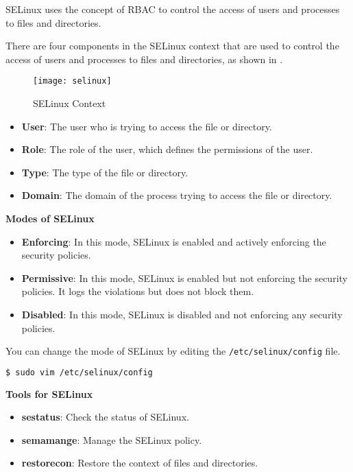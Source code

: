 SELinux uses the concept of RBAC to control the access
of users and processes to files and directories.

There are four components in the SELinux context
that are used to control the access of users and
processes to files and directories, as shown in
.

\begin{figure}[h!]
  \texttt{[image: selinux]}
  \caption{SELinux Context}
\end{figure}

\begin{itemize}
  \item \textbf{User}: The user who is trying to access
    the file or directory.
  \item \textbf{Role}: The role of the user, which defines
    the permissions of the user.
  \item \textbf{Type}: The type of the file or directory.
  \item \textbf{Domain}: The domain
    of the process trying to access the file or directory.
\end{itemize}

\textbf{Modes of SELinux}

\begin{itemize}
  \item \textbf{Enforcing}: In this mode, SELinux is enabled
    and actively enforcing the security policies.
  \item \textbf{Permissive}: In this mode, SELinux is enabled
    but not enforcing the security policies. It logs the
    violations but does not block them.
  \item \textbf{Disabled}: In this mode, SELinux is disabled
    and not enforcing any security policies.
\end{itemize}

You can change the mode of SELinux by editing the
\texttt{/etc/selinux/config} file.

\begin{lstlisting}[language=bash]
$ sudo vim /etc/selinux/config
\end{lstlisting}

\textbf{Tools for SELinux}

\begin{itemize}
  \item \textbf{sestatus}: Check the status of SELinux.
  \item \textbf{semamange}: Manage the SELinux policy.
  \item \textbf{restorecon}: Restore the context of files
    and directories.
\end{itemize}


